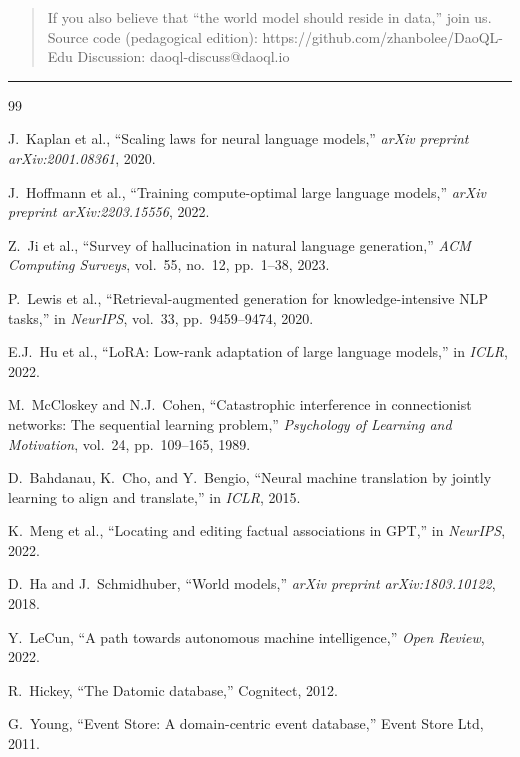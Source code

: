 \documentclass[11pt,a4paper]{article}
\begin{document}
\begin{quote}
If you also believe that ``the world model should reside in data,'' join
us. Source code (pedagogical edition):
https://github.com/zhanbolee/DaoQL-Edu Discussion:
daoql-discuss@daoql.io
\end{quote}

\begin{center}\rule{0.5\linewidth}{0.5pt}\end{center}

\begin{thebibliography}{99}

 J.~Kaplan et al., ``Scaling laws for neural language models,''
  \emph{arXiv preprint arXiv:2001.08361}, 2020.

 J.~Hoffmann et al., ``Training compute-optimal large language
  models,'' \emph{arXiv preprint arXiv:2203.15556}, 2022.

 Z.~Ji et al., ``Survey of hallucination in natural language
  generation,'' \emph{ACM Computing Surveys}, vol.~55, no.~12, pp.~1--38, 2023.

 P.~Lewis et al., ``Retrieval-augmented generation for
  knowledge-intensive NLP tasks,'' in \emph{NeurIPS}, vol.~33, pp.~9459--9474, 2020.

 E.J.~Hu et al., ``LoRA: Low-rank adaptation of large language
  models,'' in \emph{ICLR}, 2022.

 M.~McCloskey and N.J.~Cohen, ``Catastrophic interference in
  connectionist networks: The sequential learning problem,''
  \emph{Psychology of Learning and Motivation}, vol.~24, pp.~109--165, 1989.

 D.~Bahdanau, K.~Cho, and Y.~Bengio, ``Neural machine
  translation by jointly learning to align and translate,'' in \emph{ICLR}, 2015.

 K.~Meng et al., ``Locating and editing factual associations in
  GPT,'' in \emph{NeurIPS}, 2022.

 D.~Ha and J.~Schmidhuber, ``World models,''
  \emph{arXiv preprint arXiv:1803.10122}, 2018.

 Y.~LeCun, ``A path towards autonomous machine intelligence,''
  \emph{Open Review}, 2022.

 R.~Hickey, ``The Datomic database,'' Cognitect, 2012.

 G.~Young, ``Event Store: A domain-centric event database,''
  Event Store Ltd, 2011.


\end{thebibliography}
\end{document}
